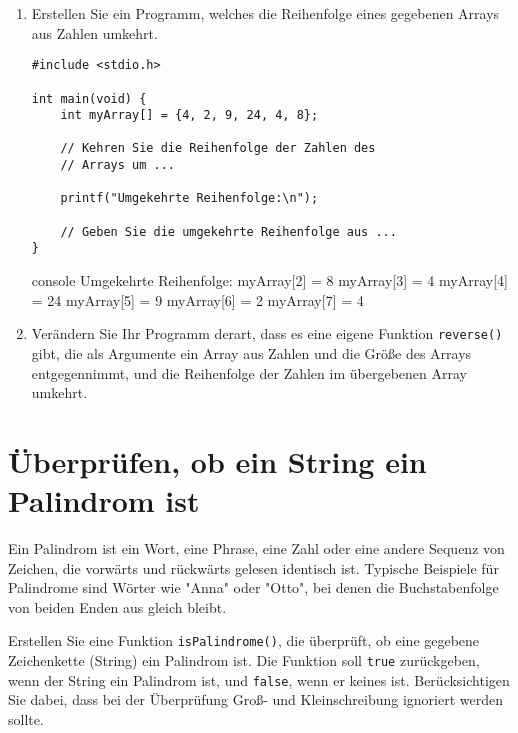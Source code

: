\begin{enumerate}
    \item Erstellen Sie ein Programm, welches die Reihenfolge eines gegebenen
    Arrays aus Zahlen umkehrt.

\Vorlage
\begin{verbatim}
#include <stdio.h>

int main(void) {
    int myArray[] = {4, 2, 9, 24, 4, 8};

    // Kehren Sie die Reihenfolge der Zahlen des
    // Arrays um ...

    printf("Umgekehrte Reihenfolge:\n");

    // Geben Sie die umgekehrte Reihenfolge aus ...
}
\end{verbatim}

\begin{mybox}[Bildschirmausgabe]{console}
    Umgekehrte Reihenfolge:
    myArray[2] = 8
    myArray[3] = 4
    myArray[4] = 24
    myArray[5] = 9
    myArray[6] = 2
    myArray[7] = 4
\end{mybox}

  \item Verändern Sie Ihr Programm derart, dass es eine eigene Funktion
  \texttt{reverse()} gibt, die als Argumente ein Array aus Zahlen und die
  Größe des Arrays entgegennimmt, und die Reihenfolge der Zahlen im übergebenen
  Array umkehrt.
\end{enumerate}



\chapter{Überprüfen, ob ein String ein Palindrom ist}

\vspace{10pt}

Ein Palindrom ist ein Wort, eine Phrase, eine Zahl oder eine andere Sequenz von
Zeichen, die vorwärts und rückwärts gelesen identisch ist. Typische Beispiele
für Palindrome sind Wörter wie "Anna" oder "Otto", bei denen die Buchstabenfolge
von beiden Enden aus gleich bleibt.

Erstellen Sie eine Funktion \texttt{isPalindrome()}, die überprüft, ob
eine gegebene Zeichenkette (String) ein Palindrom ist. Die Funktion soll
\texttt{true} zurückgeben, wenn der String ein Palindrom ist, und
\texttt{false}, wenn er keines ist. Berücksichtigen Sie dabei, dass bei
der Überprüfung Groß- und Kleinschreibung ignoriert werden sollte.

